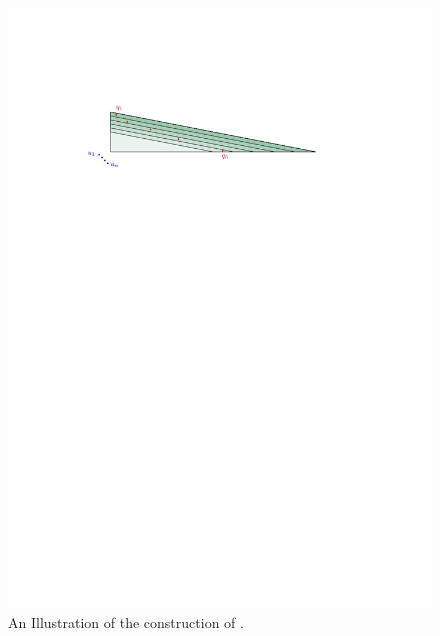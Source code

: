 \begin{figure}[b]
    \centering \includegraphics{../figs/triangle_lower_bound}
    \caption{An Illustration of the construction of
       .}
\end{figure}

